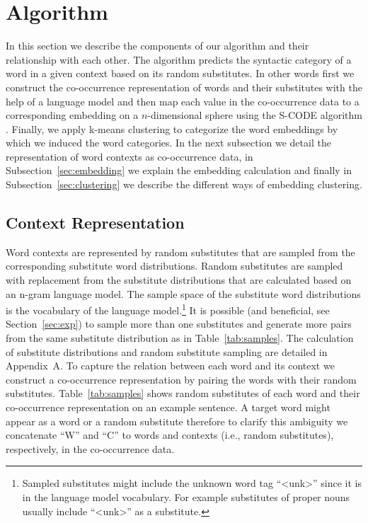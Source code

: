 \section{Algorithm}

In this section we describe the components of our algorithm and their
relationship with each other.  The algorithm predicts the syntactic
category of a word in a given context based on its random substitutes.
In other words first we construct the co-occurrence representation of
words and their substitutes with the help of a language model and then
map each value in the co-occurrence data to a corresponding embedding
on a $n$-dimensional sphere using the S-CODE algorithm
\cite{maron2010sphere}.  Finally, we apply k-means clustering to
categorize the word embeddings by which we induced the word
categories.  In the next subsection we detail the representation of
word contexts as co-occurrence data, in Subsection~\ref{sec:embedding}
we explain the embedding calculation and finally in
Subsection~\ref{sec:clustering} we describe the different ways of
embedding clustering.

\subsection{Context Representation}
\label{sec:cooc}

Word contexts are represented by random substitutes that are sampled
from the corresponding substitute word distributions.  Random
substitutes are sampled with replacement from the substitute
distributions that are calculated based on an n-gram language model.
The sample space of the substitute word distributions is the
vocabulary of the language model.\footnote{Sampled substitutes might
  include the unknown word tag ``<unk>'' since it is in the language
  model vocabulary.  For example substitutes of proper nouns usually
  include ``<unk>'' as a substitute.}  It is possible (and
beneficial, see Section~\ref{sec:exp}) to sample more than one
substitutes and generate more pairs from the same substitute
distribution as in Table~\ref{tab:samples}.  The calculation of
substitute distributions and random substitute sampling are detailed
in Appendix~A.  To capture the relation between each word and its
context we construct a co-occurrence representation by pairing the
words with their random substitutes.  Table~\ref{tab:samples} shows
random substitutes of each word and their co-occurrence representation
on an example sentence.  A target word might appear as a word or a
random substitute therefore to clarify this ambiguity we concatenate
``W'' and ``C'' to words and contexts (i.e., random substitutes),
respectively, in the co-occurrence data.

